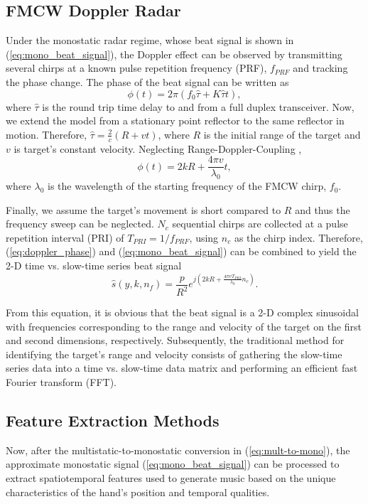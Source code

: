 \documentclass[10pt,journal,final]{IEEEtran}
\begin{document}
\subsection{FMCW Doppler Radar}
\label{subsec:fmcw_doppler_radar}
Under the monostatic radar regime, whose beat signal is shown in (\ref{eq:mono_beat_signal}), the Doppler effect can be observed by transmitting several chirps at a known pulse repetition frequency (PRF), $f_{PRF}$ and tracking the phase change. The phase of the beat signal can be written as
\begin{equation}
	\phi(t) = 2\pi(f_0 \hat{\tau} + K \hat{\tau} t),
\end{equation}
where $\hat{\tau}$ is the round trip time delay to and from a full duplex transceiver. Now, we extend the model from a stationary point reflector to the same reflector in motion. Therefore, $\hat{\tau} = \frac{2}{c}(R + vt)$, where $R$ is the initial range of the target and $v$ is target's constant velocity. Neglecting Range-Doppler-Coupling \cite{fmcw:range_doppler},
\begin{equation}
\label{eq:doppler_phase}
	\phi(t) = 2kR + \frac{4\pi v}{\lambda_0}t,
\end{equation}
where $\lambda_0$ is the wavelength of the starting frequency of the FMCW chirp, $f_0$.

Finally, we assume the target's movement is short compared to $R$ and thus the frequency sweep can be neglected. $N_c$ sequential chirps are collected at a pulse repetition interval (PRI) of $T_{PRI} = 1/f_{PRF}$, using $n_c$ as the chirp index. Therefore, (\ref{eq:doppler_phase}) and (\ref{eq:mono_beat_signal}) can be combined to yield the 2-D time vs. slow-time series beat signal
\begin{equation}
\label{eq:doppler_final}
	\hat{s}(y,k,n_f) = \frac{p}{R^2} e^{j(2kR + \frac{4\pi v T_{PRI}}{\lambda_0}n_c)}.
\end{equation}

From this equation, it is obvious that the beat signal is a 2-D complex sinusoidal with frequencies corresponding to the range and velocity of the target on the first and second dimensions, respectively. Subsequently, the traditional method for identifying the target's range and velocity consists of gathering the slow-time series data into a time vs. slow-time data matrix and performing an efficient fast Fourier transform (FFT).

\subsection{Feature Extraction Methods}
\label{subsec:feature_extraction_methods}
Now, after the multistatic-to-monostatic conversion in (\ref{eq:mult-to-mono}), the approximate monostatic signal (\ref{eq:mono_beat_signal}) can be processed to extract spatiotemporal features used to generate music based on the unique characteristics of the hand's position and temporal qualities.
\end{document}
